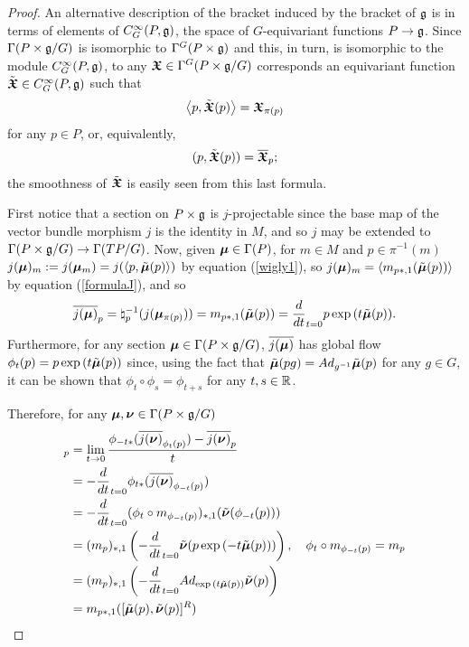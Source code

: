 \begin{proof}
An alternative description of the bracket induced by the bracket of $\mathfrak{g}$ is in terms of elements of $C^\infty_G(P, \mathfrak{g})$, the space of $G$-equivariant functions $P \to \mathfrak{g}$. Since $\Gamma(P \times \mathfrak{g}/G)$ is isomorphic to $\Gamma^G(P \times \mathfrak{g})$ and this, in turn, is isomorphic to the module $C^\infty_G(P, \mathfrak{g})$, to any $\bm{\mathfrak{X}} \in \Gamma^G(P \times \mathfrak{g}/G)$ corresponds an equivariant function $\Tilde{\bm{\mathfrak{X}}} \in C^\infty_G(P, \mathfrak{g})$ such that
\begin{align} \label{wigly1}
    \left\langle p, \Tilde{\bm{\mathfrak{X}}}(p) \right\rangle = \bm{\mathfrak{X}}_{\pi(p)} 
\end{align}
for any $p \in P$, or, equivalently,
\begin{align}\label{wigly2}
    (p, \Tilde{\bm{\mathfrak{X}}}(p)) = \overline{\bm{\mathfrak{X}}}_{p};
\end{align} the smoothness of $\Tilde{\bm{\mathfrak{X}}}$ is easily seen from this last formula.

First notice that a section on $P \times \mathfrak{g}$ is $j$-projectable since the base map of the vector bundle morphism $j$ is the identity in $M$, and so $j$ may be extended to $\Gamma(P \times \mathfrak{g}/G) \to \Gamma(TP/G)$. Now, given $\bm{\mu} \in \Gamma(P)$, for $m \in M$ and $p \in \pi^{-1}(m)$ $j(\bm{\mu})_m := j(\bm{\mu}_m) = j(\left\langle p, \Tilde{\bm{\mu}}(p) \right\rangle)$ by equation (\ref{wigly1}), so $j(\bm{\mu})_m = \left\langle m_{p*, 1}(\Tilde{\bm{\mu}}(p)) \right\rangle$ by equation (\ref{formulaJ}), and so
\begin{align}
    \overline{j(\bm{\mu})}_p = \natural_p^{-1}(j(\bm{\mu}_{\pi(p)})) = m_{p*,1}(\Tilde{\bm{\mu}}(p)) = \frac{d}{dt}_{t=0} p \exp{(t \Tilde{\ensuremath{\bm{\mu}}}(p))}.
\end{align}
Furthermore, for any section $\bm{\mu} \in \Gamma(P \times \mathfrak{g}/G)$, $\overline{j(\bm{\mu})}$ has global flow $\phi_t(p) = p \exp{(t \Tilde{\sect \mu}(p))}$ since, using the fact that $\Tilde{\bm{\mu}}(pg) = Ad_{g^{-1}} \Tilde{\bm{\mu}}(p)$ for any $g \in G$, it can be shown that $\phi_t \circ \phi_s = \phi_{t + s}$ for any $t, s \in \mathbb{R}$.

Therefore, for any $\bm{\mu}, \bm{\nu} \in \Gamma(P \times \mathfrak{g}/ G)$
\begin{align*}
    [\upsect{j(\sect \mu)}, \upsect{j(\sect \nu)}]_p 
    &= \lim_{t \to 0} \frac{\phi_{-t*}(\upsect{j(\sect \nu)}_{\phi_t(p)})  - \upsect{j(\sect \nu)}_{p} }{t}\\
    &= - \frac{d}{dt}_{t = 0} \phi_{t*} (\upsect{j(\sect \nu)}_{\phi_{-t}(p)}) \\
    &= - \frac{d}{dt}_{t = 0} (\phi_{t} \circ m_{\phi_{-t}(p)})_{*, 1} (\Tilde{\sect \nu}(\phi_{-t}(p)))\\
    &= (m_{p})_{*, 1} \left(- \frac{d}{dt}_{t = 0} \Tilde{\sect \nu}(p \exp{(-t \Tilde{\sect \mu}(p))}) \right), \quad \phi_t \circ m_{\phi_{-t}(p)} = m_p \\
    &= (m_{p})_{*, 1} \left(- \frac{d}{dt}_{t = 0} Ad_{\exp{(t \Tilde{\sect \mu}(p))}}\Tilde{\sect \nu}(p) \right) \\
    &= m_{p*, 1} ([\Tilde{\sect \mu}(p), \Tilde{\sect \nu}(p)]^R)
\end{align*}


\end{proof}
